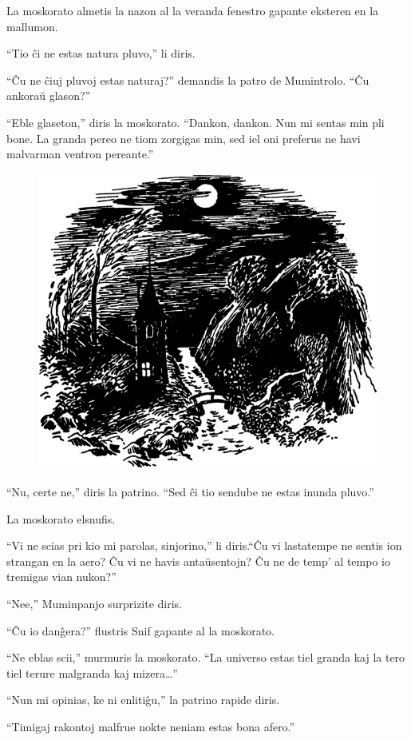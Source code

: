 La moskorato almetis la nazon al la veranda fenestro gapante eksteren en la mallumon.

``Tio ĉi ne estas natura pluvo,'' li diris.

``Ĉu ne ĉiuj pluvoj estas naturaj?'' demandis la patro de Mumintrolo. ``Ĉu ankoraŭ glason?''

``Eble glaseton,'' diris la moskorato. ``Dankon, dankon. Nun mi sentas min pli bone. La granda pereo ne tiom zorgigas min, sed iel oni preferus ne havi malvarman ventron pereante.''

\begin{figure}[htbp]
\centering
\includegraphics[width=322pt,height=278pt]{1-12.png}
\caption{}
\label{1-12}
\end{figure}

``Nu, certe ne,'' diris la patrino. ``Sed ĉi tio sendube ne estas inunda pluvo.''

La moskorato elsnufis.

``Vi ne scias pri kio mi parolas, sinjorino,'' li diris.``Ĉu vi lastatempe ne sentis ion strangan en la aero? Ĉu vi ne havis antaŭsentojn? Ĉu ne de temp' al tempo io tremigas vian nukon?''

``Nee,'' Muminpanjo surprizite diris.

``Ĉu io danĝera?'' flustris Snif gapante al la moskorato.

``Ne eblas scii,'' murmuris la moskorato. ``La universo estas tiel granda kaj la tero tiel terure malgranda kaj mizera{\ldots}''

``Nun mi opinias, ke ni enlitiĝu,'' la patrino rapide diris.

``Timigaj rakontoj malfrue nokte neniam estas bona afero.''

